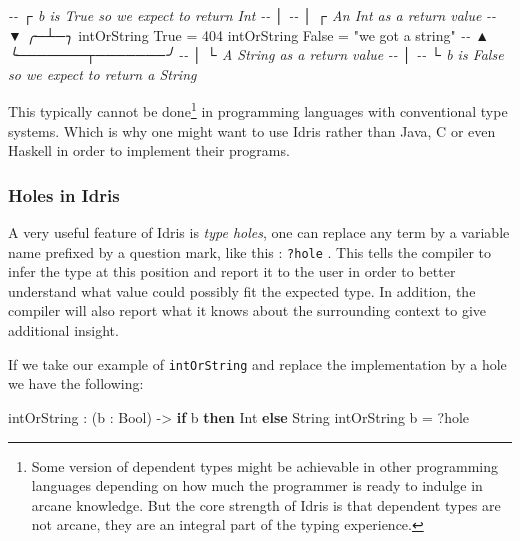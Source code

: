 \documentclass[
]{article}
\newenvironment{Shaded}{}{}
\newcommand{\CommentTok}[1]{\textcolor[rgb]{0.38,0.63,0.69}{\textit{#1}}}
\newcommand{\DataTypeTok}[1]{\textcolor[rgb]{0.56,0.13,0.00}{#1}}
\newcommand{\DecValTok}[1]{\textcolor[rgb]{0.25,0.63,0.44}{#1}}
\newcommand{\KeywordTok}[1]{\textcolor[rgb]{0.00,0.44,0.13}{\textbf{#1}}}
\newcommand{\NormalTok}[1]{#1}
\newcommand{\OperatorTok}[1]{\textcolor[rgb]{0.40,0.40,0.40}{#1}}
\newcommand{\OtherTok}[1]{\textcolor[rgb]{0.00,0.44,0.13}{#1}}
\newcommand{\StringTok}[1]{\textcolor[rgb]{0.25,0.44,0.63}{#1}}
\begin{document}
\begin{Shaded}
\begin{Highlighting}[]
\CommentTok{{-}{-}           ┌ \textasciigrave{}b\textasciigrave{} is True so we expect to return \textasciigrave{}Int\textasciigrave{}}
\CommentTok{{-}{-}           │}
\CommentTok{{-}{-}           │      ┌ An Int as a return value}
\CommentTok{{-}{-}           ▼    ╭─┴─╮}
\NormalTok{intOrString }\DataTypeTok{True} \OtherTok{=} \DecValTok{404} 
\NormalTok{intOrString }\DataTypeTok{False} \OtherTok{=} \StringTok{"we got a string"}
\CommentTok{{-}{-}           ▲      ╰───────┬───────╯}
\CommentTok{{-}{-}           │              └ A String as a return value}
\CommentTok{{-}{-}           │}
\CommentTok{{-}{-}           └ \textasciigrave{}b\textasciigrave{} is \textasciigrave{}False\textasciigrave{} so we expect to return a String}
\end{Highlighting}
\end{Shaded}

This typically cannot be done\footnote{Some version of dependent types
  might be achievable in other programming languages depending on how
  much the programmer is ready to indulge in arcane knowledge. But the
  core strength of Idris is that dependent types are not arcane, they
  are an integral part of the typing experience.} in programming
languages with conventional type systems. Which is why one might want to
use Idris rather than Java, C or even Haskell in order to implement
their programs.

\hypertarget{holes-in-idris}{%
\subsubsection{Holes in Idris}\label{holes-in-idris}}

A very useful feature of Idris is \emph{type holes}, one can replace any
term by a variable name prefixed by a question mark, like this :
\texttt{?hole} . This tells the compiler to infer the type at this
position and report it to the user in order to better understand what
value could possibly fit the expected type. In addition, the compiler
will also report what it knows about the surrounding context to give
additional insight.

If we take our example of \texttt{intOrString} and replace the
implementation by a hole we have the following:

\begin{Shaded}
\begin{Highlighting}[]
\NormalTok{intOrString }\OperatorTok{:}\NormalTok{ (b }\OperatorTok{:} \DataTypeTok{Bool}\NormalTok{) }\OtherTok{{-}\textgreater{}} \KeywordTok{if}\NormalTok{ b }\KeywordTok{then} \DataTypeTok{Int} \KeywordTok{else} \DataTypeTok{String}
\NormalTok{intOrString b }\OtherTok{=} \OperatorTok{?}\NormalTok{hole}
\end{Highlighting}
\end{Shaded}
\end{document}
